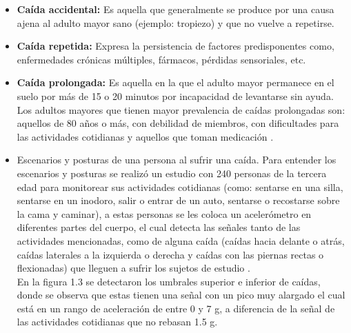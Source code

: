 \begin{enumerate}
	\begin{itemize}
		\item \textbf{Caída accidental:} Es aquella que generalmente se produce por una causa ajena al adulto mayor sano (ejemplo: tropiezo) y que no vuelve a repetirse.
		\item \textbf{Caída repetida:} Expresa la persistencia de factores predisponentes como, enfermedades crónicas múltiples, fármacos, pérdidas sensoriales, etc.
		\item \textbf{Caída prolongada:} Es aquella en la que el adulto mayor permanece en el suelo por más de 15 o 20 minutos por incapacidad de levantarse sin ayuda.	Los adultos mayores que tienen mayor prevalencia de caídas prolongadas son: aquellos de 80 años o más, con debilidad de miembros, con dificultades para las actividades cotidianas y aquellos que toman medicación \cite{doce}.
	\end{itemize}

	\begin{itemize}
		\item Escenarios y posturas de una persona al sufrir una caída.
		Para entender los escenarios y posturas se realizó un estudio con 240 personas de la tercera edad para monitorear sus actividades cotidianas (como: sentarse en una silla, sentarse en un inodoro, salir o entrar de un auto, sentarse o recostarse sobre la cama y caminar), a estas personas se les coloca un acelerómetro en diferentes partes del cuerpo, el cual detecta las señales tanto de las actividades mencionadas, como de alguna caída (caídas hacia delante o atrás, caídas laterales a la izquierda o derecha y caídas con las piernas rectas o flexionadas) que lleguen a sufrir los sujetos de estudio \cite{trece}. \\
		 
		En la figura 1.3 se detectaron los umbrales superior e inferior de caídas, donde se observa que estas tienen una señal con un pico muy alargado el cual está en un rango de aceleración de entre 0 y 7 g, a diferencia de la señal de las actividades cotidianas que no rebasan 1.5 g. \\
		

\end{itemize}
\end{enumerate}
